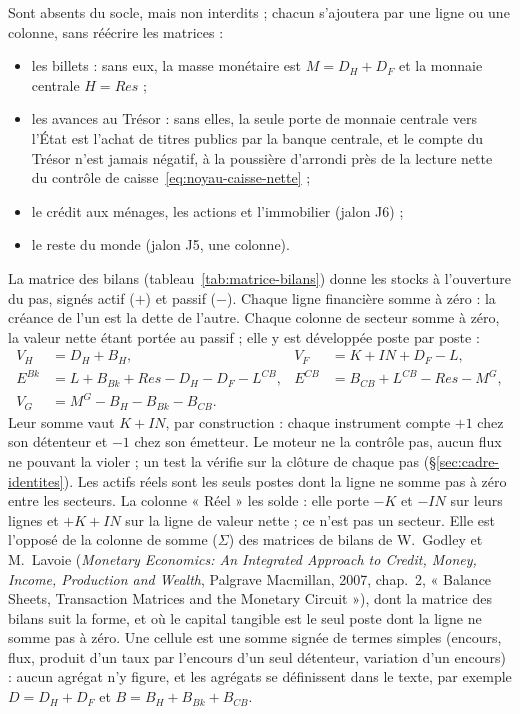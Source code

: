 \documentclass[11pt,a4paper]{article}
\begin{document}
Sont absents du socle, mais non interdits ; chacun s'ajoutera par une ligne ou une colonne, sans réécrire les matrices :
\begin{itemize}
\item les billets : sans eux, la masse monétaire est $M = D_H + D_F$ et la monnaie centrale $H = \mathit{Res}$ ;
\item les avances au Trésor : sans elles, la seule porte de monnaie centrale vers l'État est l'achat de titres publics par la banque centrale, et le compte du Trésor n'est jamais négatif, à la poussière d'arrondi près de la lecture nette du contrôle de caisse~\eqref{eq:noyau-caisse-nette} ;
\item le crédit aux ménages, les actions et l'immobilier (jalon J6) ;
\item le reste du monde (jalon J5, une colonne).
\end{itemize}

La matrice des bilans (tableau~\ref{tab:matrice-bilans}) donne les stocks à l'ouverture du pas, signés actif ($+$) et passif ($-$). Chaque ligne financière somme à zéro : la créance de l'un est la dette de l'autre. Chaque colonne de secteur somme à zéro, la valeur nette étant portée au passif ; elle y est développée poste par poste :
\begin{align*}
V_H &= D_H + B_H , & V_F &= K + \mathit{IN} + D_F - L , \\
E^{\mathit{Bk}} &= L + B_{\mathit{Bk}} + \mathit{Res} - D_H - D_F - L^{\mathit{CB}} , & E^{\mathit{CB}} &= B_{\mathit{CB}} + L^{\mathit{CB}} - \mathit{Res} - M^G , \\
V_G &= M^G - B_H - B_{\mathit{Bk}} - B_{\mathit{CB}} .
\end{align*}
Leur somme vaut $K + \mathit{IN}$, par construction : chaque instrument compte $+1$ chez son détenteur et $-1$ chez son émetteur. Le moteur ne la contrôle pas, aucun flux ne pouvant la violer ; un test la vérifie sur la clôture de chaque pas (\S\ref{sec:cadre-identites}).
Les actifs réels sont les seuls postes dont la ligne ne somme pas à zéro entre les secteurs. La colonne « Réel » les solde : elle porte $-K$ et $-\mathit{IN}$ sur leurs lignes et $+K + \mathit{IN}$ sur la ligne de valeur nette ; ce n'est pas un secteur. Elle est l'opposé de la colonne de somme ($\Sigma$) des matrices de bilans de W.~Godley et M.~Lavoie (\emph{Monetary Economics: An Integrated Approach to Credit, Money, Income, Production and Wealth}, Palgrave Macmillan, 2007, chap.~2, « Balance Sheets, Transaction Matrices and the Monetary Circuit »), dont la matrice des bilans suit la forme, et où le capital tangible est le seul poste dont la ligne ne somme pas à zéro. Une cellule est une somme signée de termes simples (encours, flux, produit d'un taux par l'encours d'un seul détenteur, variation d'un encours) : aucun agrégat n'y figure, et les agrégats se définissent dans le texte, par exemple $D = D_H + D_F$ et $B = B_H + B_{\mathit{Bk}} + B_{\mathit{CB}}$.
\end{document}
